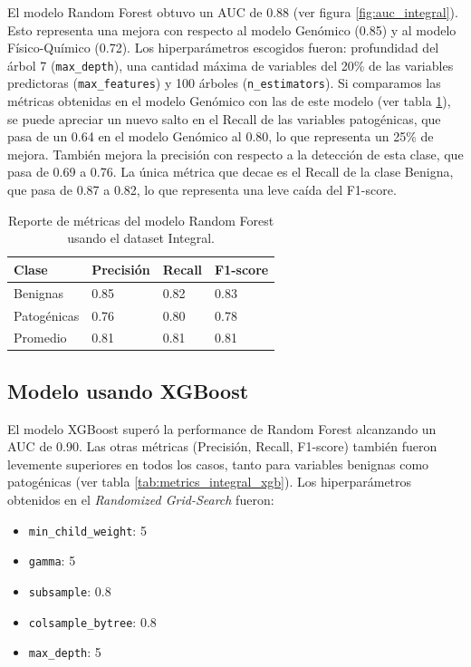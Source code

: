 El modelo Random Forest obtuvo un AUC de 0.88 (ver figura \ref{fig:auc_integral}). Esto representa una mejora con respecto al modelo Genómico (0.85) y al modelo Físico-Químico (0.72). Los hiperparámetros escogidos fueron: profundidad del árbol 7 (\texttt{max\_depth}), una cantidad máxima de variables del 20\% de las variables predictoras (\texttt{max\_features}) y 100 árboles (\texttt{n\_estimators}).
Si comparamos las métricas obtenidas en el modelo Genómico con las de este modelo (ver tabla \ref{tab:metrics_integral_rf}), se puede apreciar un nuevo salto en el Recall de las variables patogénicas, que pasa de un 0.64 en el modelo Genómico al 0.80, lo que representa un 25\% de mejora. También mejora la precisión con respecto a la detección de esta clase, que pasa de 0.69 a 0.76. La única métrica que decae es el Recall de la clase Benigna, que pasa de 0.87 a 0.82, lo que representa una leve caída del F1-score. 

\begin{table}[H]
\centering
\begin{tabular}{|l|l|l|l|}
\hline
Clase        & Precisión & Recall & F1-score \\ \hline
Benignas     & 0.85      & 0.82   & 0.83     \\ \hline
Patogénicas  & 0.76      & 0.80   & 0.78     \\ \hline
Promedio     & 0.81      & 0.81   & 0.81     \\ \hline
\end{tabular}
\caption{Reporte de métricas del modelo Random Forest usando el dataset Integral.}
\label{tab:metrics_integral_rf}
\end{table}


\subsection{Modelo usando XGBoost}

El modelo XGBoost superó la performance de Random Forest alcanzando un AUC de 0.90. Las otras métricas (Precisión, Recall, F1-score) también fueron levemente superiores en todos los casos, tanto para variables benignas como patogénicas (ver tabla \ref{tab:metrics_integral_xgb}). Los hiperparámetros obtenidos en el \textit{Randomized Grid-Search} fueron:

\begin{itemize}
    \item \texttt{min\_child\_weight}: 5
    \item \texttt{gamma}: 5
    \item \texttt{subsample}: 0.8
    \item \texttt{colsample\_bytree}: 0.8
    \item \texttt{max\_depth}: 5
\end{itemize}

